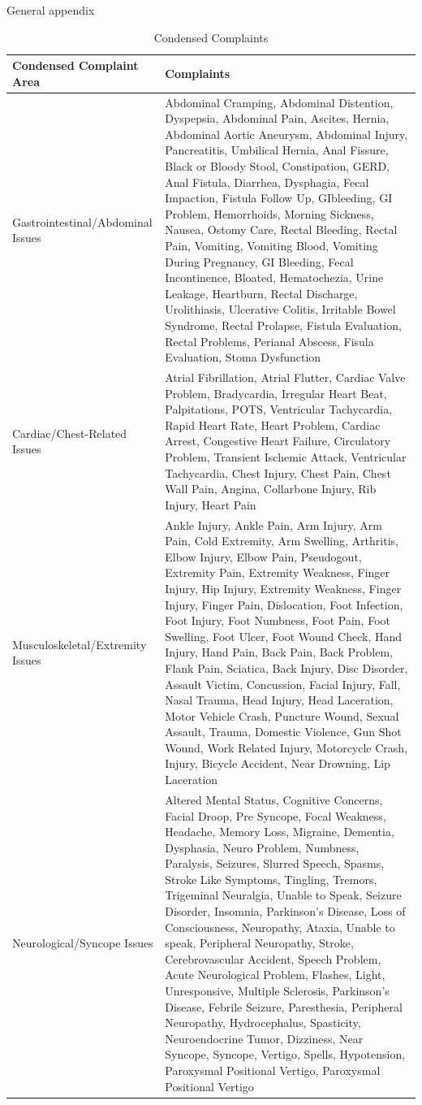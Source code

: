 \documentclass[,,nonblindrev]{informs}
\begin{document}
\begin{APPENDIX}{General appendix}
\begin{longtable}{|p{5cm}|p{12cm}|}
\caption{Condensed Complaints} \\
\hline
\textbf{Condensed Complaint Area} & \textbf{Complaints} \\
\hline
Gastrointestinal/Abdominal Issues & Abdominal Cramping, Abdominal Distention, Dyspepsia, Abdominal Pain, Ascites, Hernia, Abdominal Aortic Aneurysm, Abdominal Injury, Pancreatitis, Umbilical Hernia, Anal Fissure, Black or Bloody Stool, Constipation, GERD, Anal Fistula, Diarrhea, Dysphagia, Fecal Impaction, Fistula Follow Up, GIbleeding, GI Problem, Hemorrhoids, Morning Sickness, Nausea, Ostomy Care, Rectal Bleeding, Rectal Pain, Vomiting, Vomiting Blood, Vomiting During Pregnancy, GI Bleeding, Fecal Incontinence, Bloated, Hematochezia, Urine Leakage, Heartburn, Rectal Discharge, Urolithiasis, Ulcerative Colitis, Irritable Bowel Syndrome, Rectal Prolapse, Fistula Evaluation, Rectal Problems, Perianal Abscess, Fisula Evaluation, Stoma Dysfunction \\
\hline
Cardiac/Chest-Related Issues & Atrial Fibrillation, Atrial Flutter, Cardiac Valve Problem, Bradycardia, Irregular Heart Beat, Palpitations, POTS, Ventricular Tachycardia, Rapid Heart Rate, Heart Problem, Cardiac Arrest, Congestive Heart Failure, Circulatory Problem, Transient Ischemic Attack, Ventricular Tachycardia, Chest Injury, Chest Pain, Chest Wall Pain, Angina, Collarbone Injury, Rib Injury, Heart Pain \\
\hline
Musculoskeletal/Extremity Issues & Ankle Injury, Ankle Pain, Arm Injury, Arm Pain, Cold Extremity, Arm Swelling, Arthritis, Elbow Injury, Elbow Pain, Pseudogout, Extremity Pain, Extremity Weakness, Finger Injury, Hip Injury, Extremity Weakness, Finger Injury, Finger Pain, Dislocation, Foot Infection, Foot Injury, Foot Numbness, Foot Pain, Foot Swelling, Foot Ulcer, Foot Wound Check, Hand Injury, Hand Pain, Back Pain, Back Problem, Flank Pain, Sciatica, Back Injury, Disc Disorder, Assault Victim, Concussion, Facial Injury, Fall, Nasal Trauma, Head Injury, Head Laceration, Motor Vehicle Crash, Puncture Wound, Sexual Assault, Trauma, Domestic Violence, Gun Shot Wound, Work Related Injury, Motorcycle Crash, Injury, Bicycle Accident, Near Drowning, Lip Laceration \\
\hline
Neurological/Syncope Issues & Altered Mental Status, Cognitive Concerns, Facial Droop, Pre Syncope, Focal Weakness, Headache, Memory Loss, Migraine, Dementia, Dysphasia, Neuro Problem, Numbness, Paralysis, Seizures, Slurred Speech, Spasms, Stroke Like Symptoms, Tingling, Tremors, Trigeminal Neuralgia, Unable to Speak, Seizure Disorder, Insomnia, Parkinson's Disease, Loss of Consciousness, Neuropathy, Ataxia, Unable to speak, Peripheral Neuropathy, Stroke, Cerebrovascular Accident, Speech Problem, Acute Neurological Problem, Flashes, Light, Unresponsive, Multiple Sclerosis, Parkinson's Disease, Febrile Seizure, Paresthesia, Peripheral Neuropathy, Hydrocephalus, Spasticity, Neuroendocrine Tumor, Dizziness, Near Syncope, Syncope, Vertigo, Spells, Hypotension, Paroxysmal Positional Vertigo, Paroxysmal Positional Vertigo \\

\end{longtable}
\end{APPENDIX}
\end{document}
